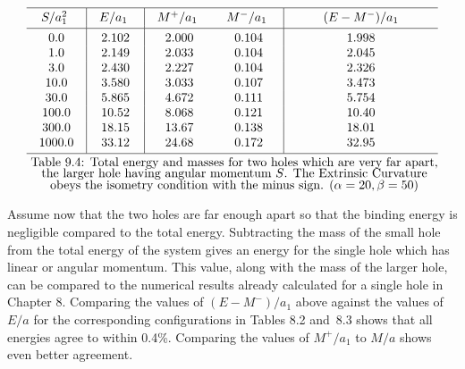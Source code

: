 $$
\vbox{\offinterlineskip
\hrule
\halign{\quad\hfil#\hfil\quad&\vrule#&
\strut\quad\hfil#\hfil\quad&\vrule#&
\quad\hfil#\hfil\quad&
\quad\hfil#\hfil\quad&\vrule#&
\quad\hfil#\hfil\quad\cr
\omit&height2pt&\omit&&\omit&\omit&&\omit\cr
 $S/a_1^2$ &&	$E/a_1$ &&	$M^+/a_1$ &	$M^-/a_1$ &&	$(E - M^-)/a_1$\cr
\omit&height2pt&\omit&&\omit&\omit&&\omit\cr
\noalign{\hrule}
\omit&height2pt&\omit&&\omit&\omit&&\omit\cr
	0.0&&2.102&&2.000&0.104&&1.998\cr
	1.0&&2.149&&2.033&0.104&&2.045\cr
	3.0&&2.430&&2.227&0.104&&2.326\cr
	10.0&&3.580&&3.033&0.107&&3.473\cr
	30.0&&5.865&&4.672&0.111&&5.754\cr
	100.0&&10.52&&8.068&0.121&&10.40\cr
	300.0&&18.15&&13.67&0.138&&18.01\cr
	1000.0&&33.12&&24.68&0.172&&32.95\cr
\omit&height2pt&\omit&&\omit&\omit&&\omit\cr
\noalign{\hrule}
\noalign{\smallskip}
\multispan8 \hfil Table~9.4:  Total energy and masses for two holes which are
very far apart,\hfil\cr
\multispan8 \hfil the larger hole having angular momentum $S$.  The Extrinsic
Curvature\hfil\cr
\multispan8 \hfil obeys the isometry condition with the minus sign. 
$(\alpha=20,\beta=50)$\hfil\cr}}
$$

Assume now that the two holes are far enough apart so that the binding energy is
negligible compared to the total energy.   Subtracting the mass of the small
hole from the total energy  of the system gives an energy for the single hole
which has linear or angular momentum.  This value, along with the mass of the
larger hole, can be compared to the numerical results already calculated for a
single hole in Chapter 8.  Comparing the values of $(E - M^-)/a_1$ above against
the values of $E/a$ for the corresponding configurations in Tables 8.2 and~8.3
shows that all energies agree to within 0.4\%.  Comparing the values of
$M^+/a_1$ to $M/a$ shows even better agreement.

